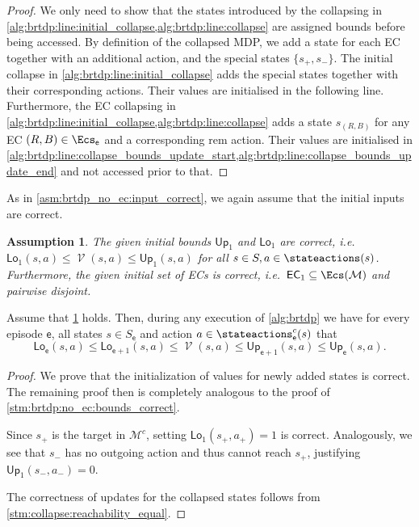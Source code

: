 \documentclass{theoretics}
\newcommand{\MDP}{\mathcal{M}}
\newcommand{\States}{S}
\DeclareMathOperator{\val}{\mathcal{V}}
\newcommand{\upperbound}{\mathsf{Up}}
\newcommand{\lowerbound}{\mathsf{Lo}}
\newcommand{\targetstate}{s_+}
\newcommand{\sinkstate}{s_-}
\newcommand{\ecremain}{\mathrm{rem}}
\newcommand{\algoepisode}{\mathsf{e}}
\newcommand{\algoecs}{\mathsf{EC}}
\newtheorem{assumption}{Assumption}
\begin{document}
\begin{proof}
	We only need to show that the states introduced by the collapsing in \cref{alg:brtdp:line:initial_collapse,alg:brtdp:line:collapse} are assigned bounds before being accessed.
	By definition of the collapsed MDP, we add a state for each EC together with an additional action, and the special states $\{\targetstate, \sinkstate\}$.
	The initial collapse in \cref{alg:brtdp:line:initial_collapse} adds the special states together with their corresponding actions.
	Their values are initialised in the following line.
	Furthermore, the EC collapsing in \cref{alg:brtdp:line:initial_collapse,alg:brtdp:line:collapse} adds a state $s_{(R,B)}$ for any EC $(R,B) \in \Ecs_\algoepisode$ and a corresponding $\ecremain$ action.
	Their values are initialised in \cref{alg:brtdp:line:collapse_bounds_update_start,alg:brtdp:line:collapse_bounds_update_end} and not accessed prior to that. 
\end{proof}
As in \cref{asm:brtdp_no_ec:input_correct}, we again assume that the initial inputs are correct.
\begin{assumption} \label{asm:brtdp_input_correct}
	The given initial bounds $\upperbound_1$ and $\lowerbound_1$ are correct, i.e.\ $\lowerbound_1(s, a) \leq \val(s, a) \leq \upperbound_1(s, a)$ for all $s \in \States, a \in \stateactions(s)$.
	Furthermore, the given initial set of ECs is correct, i.e.\ $\algoecs_1 \subseteq \Ecs(\MDP)$ and pairwise disjoint.
\end{assumption}
\begin{lemma} \label{stm:brtdp:bounds_correct}
	Assume that \cref{asm:brtdp_input_correct} holds.
	Then, during any execution of \cref{alg:brtdp} we have for every episode $\algoepisode$, all states $s \in \States_\algoepisode$ and action $a \in \stateactions^c_\algoepisode(s)$ that
	\begin{equation*}
		\lowerbound_\algoepisode(s, a) \leq \lowerbound_{\algoepisode + 1}(s, a) \leq \val(s, a) \leq \upperbound_{\algoepisode + 1}(s, a) \leq \upperbound_\algoepisode(s, a).
	\end{equation*}
\end{lemma}

\begin{proof}
	We prove that the initialization of values for newly added states is correct.
	The remaining proof then is completely analogous to the proof of \cref{stm:brtdp:no_ec:bounds_correct}.

	Since $\targetstate$ is the target in $\MDP^c$, setting $\lowerbound_1(\targetstate, a_+) = 1$ is correct.
	Analogously, we see that $\sinkstate$ has no outgoing action and thus cannot reach $\targetstate$, justifying $\upperbound_1(\sinkstate, a_-) = 0$.

	The correctness of updates for the collapsed states follows from \cref{stm:collapse:reachability_equal}. 
\end{proof}
\end{document}
